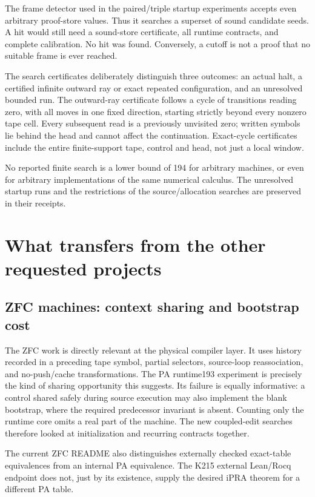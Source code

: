 \documentclass[11pt,letterpaper]{article}
\begin{document}
The frame detector used in the paired/triple startup experiments accepts
even arbitrary proof-store values. Thus it searches a superset of sound
candidate seeds. A hit would still need a sound-store certificate, all
runtime contracts, and complete calibration. No hit was found. Conversely,
a cutoff is not a proof that no suitable frame is ever reached.

The search certificates deliberately distinguish three outcomes: an actual
halt, a certified infinite outward ray or exact repeated configuration,
and an unresolved bounded run. The outward-ray certificate follows a
cycle of transitions reading zero, with all moves in one fixed direction,
starting strictly beyond every nonzero tape cell. Every subsequent read
is a previously unvisited zero; written symbols lie behind the head and
cannot affect the continuation. Exact-cycle certificates include the
entire finite-support tape, control and head, not just a local window.

No reported finite search is a lower bound of 194 for arbitrary machines,
or even for arbitrary implementations of the same numerical calculus.
The unresolved startup runs and the restrictions of the source/allocation
searches are preserved in their receipts.



\section{What transfers from the other requested projects}
\label{sec:other}

\subsection{ZFC machines: context sharing and bootstrap cost}

The ZFC work is directly relevant at the physical compiler layer. It uses
history recorded in a preceding tape symbol, partial selectors,
source-loop reassociation, and no-push/cache transformations. The PA
runtime193 experiment is precisely the kind of sharing opportunity this
suggests. Its failure is equally informative: a control shared safely
during source execution may also implement the blank bootstrap, where the
required predecessor invariant is absent. Counting only the runtime core
omits a real part of the machine. The new coupled-edit searches therefore
looked at initialization and recurring contracts together.

The current ZFC README also distinguishes externally checked exact-table
equivalences from an internal PA equivalence. The K215 external Lean/Rocq
endpoint does not, just by its existence, supply the desired iPRA theorem
for a different PA table.
\end{document}
